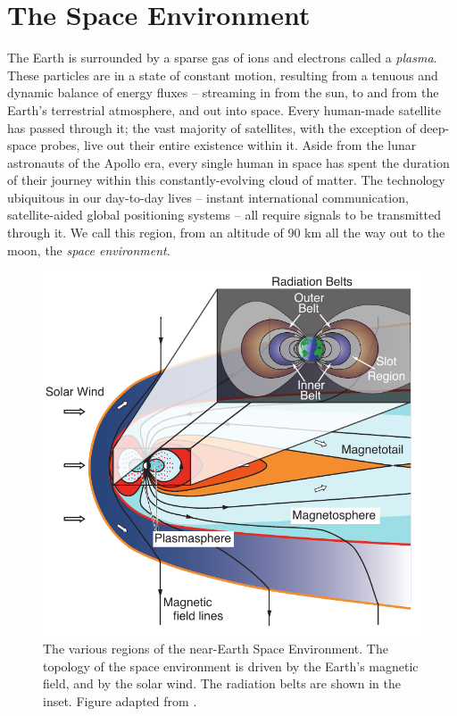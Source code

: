 \section{The Space Environment}
The Earth is surrounded by a sparse gas of ions and electrons called a \emph{plasma}. 
These particles are in a state of constant motion, resulting from a tenuous and dynamic balance of energy fluxes -- streaming in from the sun, to and from the Earth's terrestrial atmosphere, and out into space. Every human-made satellite has passed through it; the vast majority of satellites, with the exception of deep-space probes, live out their entire existence within it. Aside from the lunar astronauts of the Apollo era, every single human in space has spent the duration of their journey within this constantly-evolving cloud of matter. The technology ubiquitous in our day-to-day lives -- instant international communication, satellite-aided global positioning systems -- all require signals to be transmitted through it. We call this region, from an altitude of 90 km all the way out to the moon, the \emph{space environment}.


\begin{figure}[t]
\begin{center}
\includegraphics{figures/space_environment_figure.pdf}
\caption[Diagram of the various regions of the space environment]{The various regions of the near-Earth Space Environment. The topology of the space environment is driven by the Earth's magnetic field, and by the solar wind. The radiation belts are shown in the inset. Figure adapted from \cite{Graf2013}.}
\label{fig:space_environment}
\end{center}
\end{figure}

